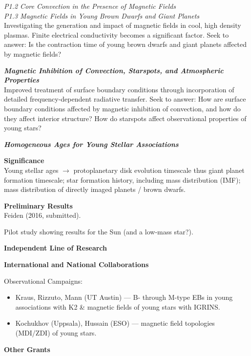 \documentclass[12pt,a4paper]{article}
\begin{document}
\emph{P1.2 Core Convection in the Presence of Magnetic Fields} \\

\emph{P1.3 Magnetic Fields in Young Brown Dwarfs and Giant Planets} \\
Investigating the generation and impact of magnetic fields in cool, high density plasmas. Finite electrical conductivity becomes a significant factor. Seek to answer: Is the contraction time of young brown dwarfs and giant planets affected by magnetic fields?

\textbf{\emph{Magnetic Inhibition of Convection, Starspots, and Atmospheric Properties}} \\
Improved treatment of surface boundary conditions through incorporation of detailed frequency-dependent radiative transfer. Seek to answer: How are surface boundary conditions affected by magnetic inhibition of convection, and how do they affect interior structure? How do starspots affect observational properties of young stars? 

\textbf{\emph{Homogeneous Ages for Young Stellar Associations}}

{\bf \large Significance} \\
Young stellar ages $\rightarrow$ protoplanetary disk evolution timescale thus giant planet formation timescale; star formation history, including mass distribution (IMF); mass distribution of directly imaged planets / brown dwarfs.

{\bf \large Preliminary Results} \\
Feiden (2016, submitted).

Pilot study showing results for the Sun (and a low-mass star?).

{\bf \large Independent Line of Research}

{\bf \large International and National Collaborations}

Observational Campaigns:
\begin{itemize}
	\item Kraus, Rizzuto, Mann (UT Austin) --- B- through M-type EBs in young associations with K2 \& magnetic fields of young stars with IGRINS.
	\item Kochukhov (Uppsala), Hussain (ESO) --- magnetic field topologies (MDI/ZDI) of young stars.
\end{itemize}

{\bf \large Other Grants}
\end{document}
